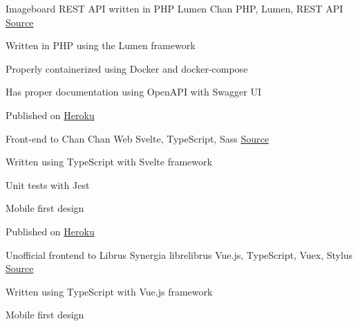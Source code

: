 

\begin{cventries}

  \cventry
    {Imageboard REST API written in PHP Lumen} %
    {Chan} %
    {PHP, Lumen, REST API} %
    {\href{https://github.com/ravensiris/chan}{\faGithubSquare\acvHeaderIconSep Source}} %
    {
      \begin{cvitems} %
        \item {Written in PHP using the Lumen framework}
        \item {Properly containerized using Docker and docker-compose}
        \item {Has proper documentation using OpenAPI with Swagger UI}
        \item {Published on \href{http://chan-api-ri.herokuapp.com/docs}{Heroku}}
      \end{cvitems}
    } %
  \cventry
    {Front-end to Chan} %
    {Chan Web} %
    {Svelte, TypeScript, Sass} %
    {\href{https://github.com/ravensiris/chan-web}{\faGithubSquare\acvHeaderIconSep Source}} %
    {
      \begin{cvitems} %
        \item {Written using TypeScript with Svelte framework}
        \item {Unit tests with Jest}
        \item {Mobile first design}
        \item {Published on \href{http://chan-ri.herokuapp.com/}{Heroku}}
      \end{cvitems}
    } %
  \cventry
    {Unofficial frontend to Librus Synergia} %
    {librelibrus} %
    {Vue.js, TypeScript, Vuex, Stylus} %
    {\href{https://github.com/ravensiris/librelibrus}{\faGithubSquare\acvHeaderIconSep Source}} %
    {
      \begin{cvitems} %
        \item {Written using TypeScript with Vue.js framework}
        \item {Mobile first design}
      \end{cvitems}
    } %

\end{cventries}
